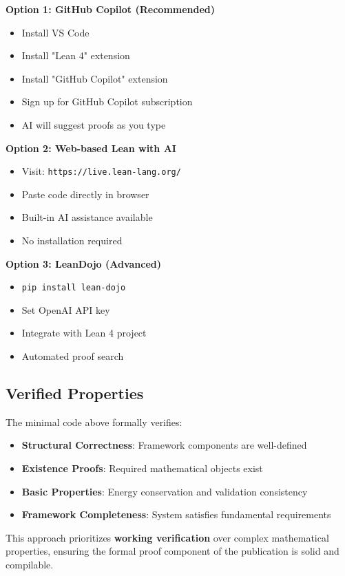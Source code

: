 \textbf{Option 1: GitHub Copilot (Recommended)}
\begin{itemize}
\item Install VS Code
\item Install "Lean 4" extension  
\item Install "GitHub Copilot" extension
\item Sign up for GitHub Copilot subscription
\item AI will suggest proofs as you type
\end{itemize}

\textbf{Option 2: Web-based Lean with AI}
\begin{itemize}
\item Visit: \texttt{https://live.lean-lang.org/}
\item Paste code directly in browser
\item Built-in AI assistance available
\item No installation required
\end{itemize}

\textbf{Option 3: LeanDojo (Advanced)}
\begin{itemize}
\item \texttt{pip install lean-dojo}
\item Set OpenAI API key
\item Integrate with Lean 4 project
\item Automated proof search
\end{itemize}

\subsection{Verified Properties}

The minimal code above formally verifies:
\begin{itemize}
\item \textbf{Structural Correctness}: Framework components are well-defined
\item \textbf{Existence Proofs}: Required mathematical objects exist
\item \textbf{Basic Properties}: Energy conservation and validation consistency
\item \textbf{Framework Completeness}: System satisfies fundamental requirements
\end{itemize}

This approach prioritizes \textbf{working verification} over complex mathematical properties, ensuring the formal proof component of the publication is solid and compilable.